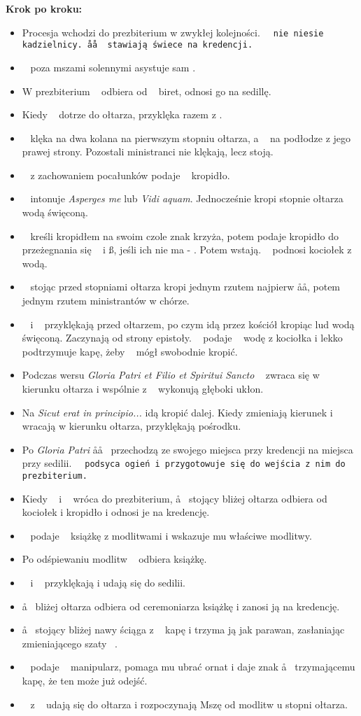 		\textbf{Krok po kroku:}
		\begin{itemize}
			\item Procesja wchodzi do prezbiterium w zwykłej kolejności. \tt~ nie niesie			kadzielnicy. \aa\aa~ stawiają świece na kredencji.
			\item \ii~ poza mszami solennymi asystuje sam \cc.
			\item W prezbiterium \cc~ odbiera od \ii~ biret, odnosi go na sedillę.
			\item Kiedy \ii~ dotrze do ołtarza, przyklęka razem z \cc.
			\item \ii~ klęka na dwa kolana na pierwszym stopniu ołtarza, a \cc~ na podłodze z jego prawej strony. Pozostali ministranci nie klękają, lecz stoją.
			\item \cc~ z zachowaniem pocałunków podaje \ii~ kropidło.
			\item \ii~ intonuje \textit{Asperges me} lub \textit{Vidi aquam}. Jednocześnie kropi stopnie ołtarza wodą święconą.
			\item \ii~ kreśli kropidłem na swoim czole znak krzyża, potem podaje kropidło do przeżegnania się \dd~ i \ss, jeśli ich nie ma - \cc. Potem wstają. \cc~ podnosi kociołek z wodą.
			\item \ii~ stojąc przed stopniami ołtarza kropi jednym rzutem najpierw \aa\aa, potem jednym rzutem ministrantów w chórze.
			\item \ii~ i \cc~ przyklękają przed ołtarzem, po czym idą przez kościół kropiąc lud wodą święconą. Zaczynają od strony epistoły. \cc~ podaje	\ii~ wodę z kociołka i lekko podtrzymuje kapę, żeby \ii~ mógł swobodnie kropić.
			\item Podczas wersu \textit{Gloria Patri et Filio et Spiritui Sancto} \ii~ zwraca się w kierunku ołtarza i wspólnie z \cc~ wykonują głęboki ukłon.
			\item Na \textit{Sicut erat in principio...} idą kropić dalej. Kiedy zmieniają kierunek i wracają w kierunku ołtarza, przyklękają pośrodku.
			\item Po \textit{Gloria Patri} \aa\aa~ przechodzą ze swojego miejsca przy kredencji na miejsca przy sedilii. \tt~ podsyca ogień i przygotowuje się do wejścia z nim do prezbiterium.
			\item Kiedy \ii~ i \cc~ wróca do prezbiterium, \aa~ stojący bliżej ołtarza odbiera od \cc~ kociołek i kropidło i odnosi je na kredencję.
			\item \cc~ podaje \ii~ książkę z modlitwami i wskazuje mu właściwe modlitwy.
			\item Po odśpiewaniu modlitw \cc~ odbiera książkę.
			\item \ii~ i \cc~ przyklękają i udają się do sedilii.
			\item \aa~ bliżej ołtarza odbiera od ceremoniarza książkę i zanosi ją na kredencję.
			\item \aa~ stojący bliżej nawy ściąga z \ii~ kapę i trzyma ją jak parawan, zasłaniając zmieniającego szaty \ii~.
			\item \cc~ podaje \ii~ manipularz, pomaga mu ubrać ornat i daje znak \aa~ trzymającemu kapę, że ten może już odejść.
			\item \ii~ z \cc~ udają się do ołtarza i rozpoczynają Mszę od modlitw u stopni ołtarza.
		\end{itemize}